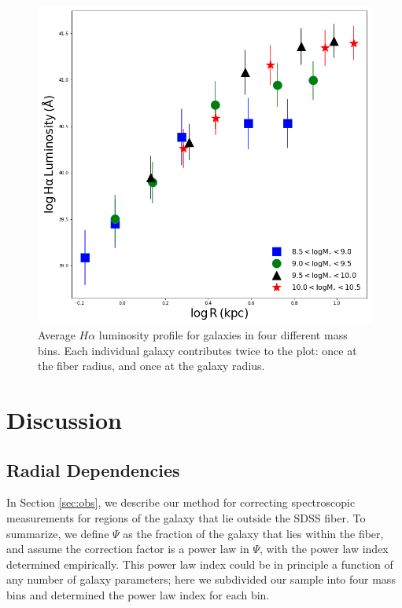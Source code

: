 \documentclass[iop]{emulateapj}
\begin{document}
\begin{figure}
	\centering
	\includegraphics[width= \columnwidth]{gradients_HA.png}
	\caption{Average $H\alpha$ luminosity profile for galaxies in four different mass bins. Each individual galaxy contributes twice to the plot: once at the fiber radius, and once at the galaxy radius.}
     \label{fig:grad_EW}

\end{figure}

\section{Discussion}

\subsection{Radial Dependencies}

In Section \ref{sec:obs}, we describe our method for correcting spectroscopic measurements for regions of the galaxy that lie outside the SDSS fiber. To summarize, we define $\Psi$ as the fraction of the galaxy that lies within the fiber, and assume the correction factor is a power law in $\Psi$, with the power law index determined empirically. This power law index could be in principle a function of any number of galaxy parameters; here we subdivided our sample into four mass bins and determined the power law index for each bin.
\end{document}
